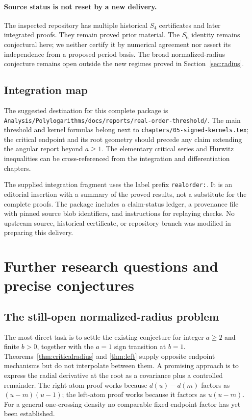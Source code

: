 \documentclass[11pt]{article}
\numberwithin{equation}{section}
\theoremstyle{definition}\newtheorem{definition}[theorem]{Definition}
\theoremstyle{remark}\newtheorem{remark}[theorem]{Remark}
\begin{document}
\paragraph{Source status is not reset by a new delivery.}
The inspected repository has multiple historical $S_4$ certificates
and later integrated proofs. They remain proved prior material.
The $S_6$ identity remains conjectural here; we neither certify it
by numerical agreement nor assert its independence from a proposed
period basis. The broad normalized-radius conjecture remains open
outside the new regimes proved in Section~\ref{sec:radius}.

\subsection{Integration map}
The suggested destination for this complete package is
\nolinkurl{Analysis/Polylogarithms/docs/reports/real-order-threshold/}.
The main threshold and kernel formulas belong next to
\nolinkurl{chapters/05-signed-kernels.tex}; the critical endpoint and
its root geometry should precede any claim extending the angular
report beyond $a\ge1$. The elementary critical series and Hurwitz
inequalities can be cross-referenced from the integration and
differentiation chapters.

The supplied integration fragment uses the label prefix
\texttt{realorder:}. It is an editorial insertion with a summary of
the proved results, not a substitute for the complete proofs. The
package includes a claim-status ledger, a provenance file with pinned
source blob identifiers, and instructions for replaying checks. No
upstream source, historical certificate, or repository branch was
modified in preparing this delivery.

\section{Further research questions and precise conjectures}
\label{sec:future}

\subsection{The still-open normalized-radius problem}
The most direct task is to settle the existing conjecture for integer
$a\ge2$ and finite $b>0$, together with the $a=1$ sign transition at
$b=1$. Theorems~\ref{thm:criticalradius} and \ref{thm:left} supply
opposite endpoint mechanisms but do not interpolate between them.
A promising approach is to express the radial derivative at the root
as a covariance plus a controlled remainder. The right-atom proof
works because $d(u)-d(m)$ factors as $(u-m)(u-1)$; the left-atom proof
works because it factors as $u(u-m)$. For a general one-crossing
density no comparable fixed endpoint factor has yet been established.
\end{document}
